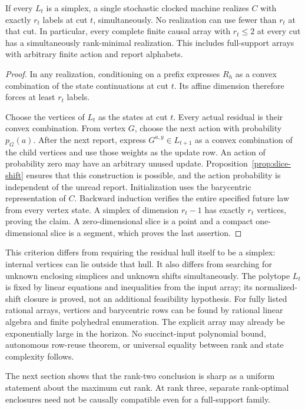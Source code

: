 \begin{theorem}
\label{thm:slice}
If every $L_t$ is a simplex, a single stochastic clocked machine realizes
$C$ with exactly $r_t$ labels at cut $t$, simultaneously. No realization
can use fewer than $r_t$ at that cut. In particular, every complete
finite causal array with $r_t\le2$ at every cut has a simultaneously
rank-minimal realization. This includes full-support arrays with
arbitrary finite action and report alphabets.
\end{theorem}
\begin{proof}
In any realization, conditioning on a prefix expresses $R_h$ as a convex
combination of the state continuations at cut $t$. Its affine dimension
therefore forces at least $r_t$ labels.

Choose the vertices of $L_t$ as the states at cut $t$. Every actual
residual is their convex combination. From vertex $G$, choose the next
action with probability $p_G(a)$. After the next report, express
$G^{a,y}\in L_{t+1}$ as a convex combination of the child vertices and
use those weights as the update row. An action of probability zero may
have an arbitrary unused update. Proposition~\ref{prop:slice-shift}
ensures that this construction is possible, and the action probability
is independent of the unread report. Initialization uses the
barycentric representation of $C$. Backward induction verifies the entire
specified future law from every vertex state. A simplex of dimension
$r_t-1$ has exactly $r_t$ vertices, proving the claim. A zero-dimensional
slice is a point and a compact one-dimensional slice is a segment, which
proves the last assertion.
\end{proof}

This criterion differs from requiring the residual hull itself to be a
simplex: internal vertices can lie outside that hull. It also differs
from searching for unknown enclosing simplices and unknown shifts
simultaneously. The polytope $L_t$ is fixed by linear equations and
inequalities from the input array; its normalized-shift closure is
proved, not an additional feasibility hypothesis. For fully listed
rational arrays, vertices and barycentric rows can be found by rational
linear algebra and finite polyhedral enumeration. The explicit array
may already be exponentially large in the horizon. No succinct-input
polynomial bound, autonomous row-reuse theorem, or universal equality
between rank and state complexity follows.

The next section shows that the rank-two conclusion is sharp as a
uniform statement about the maximum cut rank. At rank three, separate
rank-optimal enclosures need not be causally compatible even for a
full-support family.
